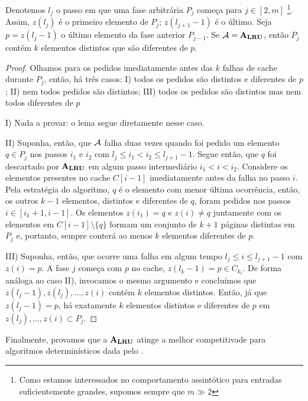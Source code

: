 \begin{lemma}
  \label{lem:k-part}

  Denotemos \(l_j\) o passo em que uma fase arbitrária \(P_j\) começa para \(j \in [2,m]\) \footnote{Como estamos interessados no comportamento assintótico para entradas suficientemente grandes, supomos sempre que \(m \gg 2\)}. Assim, \(z(l_j)\) é o primeiro elemento de \(P_j\); \(z(l_{j+1}-1)\) é o último. Seja \(p = z(l_j-1)\) o último elemento da fase anterior \(P_{j-1}\). Se \(\mathcal{A} = \mathbf{A_{LRU}}\), então \(P_j\) contém \(k\) elementos distintos que são diferentes de \(p\).
  \begin{proof} Olhamos para os pedidos imediatamente antes das \(k\) falhas de cache durante \(P_j\), então, há três casos: I) todos os pedidos são distintos e diferentes de \(p\); II) nem todos pedidos são distintos; III) todos os pedidos são distintos mas nem todos diferentes de \(p\)

  I) Nada a provar: o lema segue diretamente nesse caso.

  II) Suponha, então, que \(\mathcal{A}\) falha duas vezes quando foi pedido um elemento \(q \in P_j\) nos passos \(i_1\) e \(i_2\) com \(l_j \le i_1 < i_2 \le l_{j+1} - 1\). Segue então, que \(q\) foi descartado por \(\mathbf{A_{LRU}}\) em algum passo intermediário \(i_1 < i < i_2\). Considere os elementos presentes no cache \(C[i-1]\) imediatamente antes da falha no passo \(i\). Pela estratégia do algoritmo, \(q\) é o elemento com menor última ocorrência, então, os outros \(k-1\) elementos, distintos e diferentes de \(q\), foram pedidos nos passos \(i \in [i_1+1, i-1]\). Os elementos \(z(i_1) = q\) e \(z(i) \neq q\) juntamente com os elementos em \(C[i-1] \setminus \{q\}\) formam um conjunto de \(k+1\) páginas distintas em \(P_j\) e, portanto, sempre conterá ao menos \(k\) elementos diferentes de \(p\).

  III) Suponha, então, que ocorre uma falha em algum tempo \(l_j \le i \le l_{j+1}-1\) com \(z(i) = p\). A fase \(j\) começa com \(p\) no cache, \(z(l_k-1) = p \in C_{k_i}\). De forma análoga ao caso II), invocamos o mesmo argumento e concluímos que \(z(l_j-1), z(l_j), \dotsc, z(i)\) contém \(k\) elementos distintos. Então, já que \(z(l_j-1) = p\), há exatamente \(k\) elementos distintos e diferentes de \(p\) em \(z(l_j), \dotsc, z(i) \subset P_j\).

\end{proof}
\end{lemma}

Finalmente, provamos que a \(\mathbf{A_{LRU}}\) atinge a melhor competitivade para algoritmos determinísticos dada pelo .


